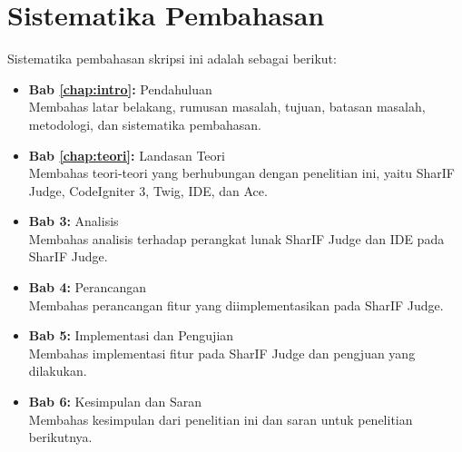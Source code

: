 \section{Sistematika Pembahasan}
\label{sec:1:sispem}

Sistematika pembahasan skripsi ini adalah sebagai berikut:
\begin{itemize}
    \item \textbf{Bab \ref{chap:intro}:} Pendahuluan \\
          Membahas latar belakang, rumusan masalah, tujuan, batasan masalah, metodologi, dan sistematika pembahasan.
    \item \textbf{Bab \ref{chap:teori}:} Landasan Teori \\
          Membahas teori-teori yang berhubungan dengan penelitian ini, yaitu SharIF Judge, CodeIgniter 3, Twig, IDE, dan Ace.
    \item \textbf{Bab 3:} Analisis \\
          Membahas analisis terhadap perangkat lunak SharIF Judge dan IDE pada SharIF Judge.
    \item \textbf{Bab 4:} Perancangan \\
          Membahas perancangan fitur yang diimplementasikan pada SharIF Judge.
    \item \textbf{Bab 5:} Implementasi dan Pengujian \\
          Membahas implementasi fitur pada SharIF Judge dan pengjuan yang dilakukan.
    \item \textbf{Bab 6:} Kesimpulan dan Saran \\
          Membahas kesimpulan dari penelitian ini dan saran untuk penelitian berikutnya.
\end{itemize}